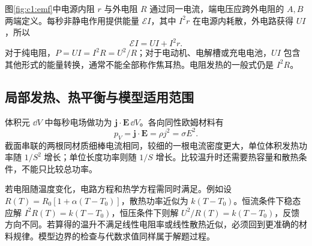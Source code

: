 图\ref{fig:c1:emf}中电源内阻 $r$ 与外电阻 $R$ 通过同一电流，端电压应跨外电阻的 $A,B$ 两端定义。每秒非静电作用提供能量 $\mathcal EI$，其中 $I^2r$ 在电源内耗散，外电路获得 $UI$，所以
\[
 \mathcal EI=UI+I^2r.
\]
对于纯电阻，$P=UI=I^2R=U^2/R$；对于电动机、电解槽或充电电池，$UI$ 包含其他形式的能量转换，通常不能全部称作焦耳热。电阻发热的一般式仍是 $I^2R$。
\subsection{局部发热、热平衡与模型适用范围}

体积元 $\dd V$ 中每秒电场做功为 $\bm j\cdot\bm E\,\dd V$。各向同性欧姆材料有
\[
 p_V=\bm j\cdot\bm E=\rho j^2=\sigma E^2.
\]
截面串联的两根同材质细棒电流相同，较细的一根电流密度更大，单位体积发热功率随 $1/S^2$ 增长；单位长度功率则随 $1/S$ 增长。比较温升时还需要热容量和散热条件，不能只比较总功率。

若电阻随温度变化，电路方程和热学方程需同时满足。例如设 $R(T)=R_0[1+\alpha(T-T_0)]$，散热功率近似为 $k(T-T_0)$。恒流条件下稳态应解 $I^2R(T)=k(T-T_0)$，恒压条件下则解 $U^2/R(T)=k(T-T_0)$，反馈方向不同。若算得的温升不满足线性电阻率或线性散热近似，必须回到更准确的材料规律。模型边界的检查与代数求值同样属于解题过程。


